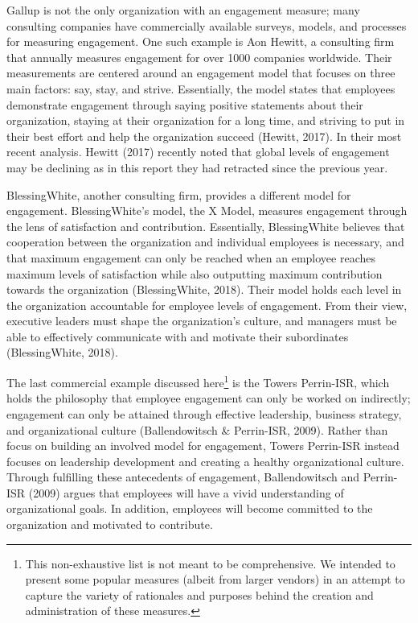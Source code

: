 \documentclass[
  man]{apa6}
\begin{document}
Gallup is not the only organization with an engagement measure; many consulting companies have commercially available surveys, models, and processes for measuring engagement. One such example is Aon Hewitt, a consulting firm that annually measures engagement for over 1000 companies worldwide. Their measurements are centered around an engagement model that focuses on three main factors: say, stay, and strive. Essentially, the model states that employees demonstrate engagement through saying positive statements about their organization, staying at their organization for a long time, and striving to put in their best effort and help the organization succeed (Hewitt, 2017). In their most recent analysis. Hewitt (2017) recently noted that global levels of engagement may be declining as in this report they had retracted since the previous year.

BlessingWhite, another consulting firm, provides a different model for engagement. BlessingWhite's model, the X Model, measures engagement through the lens of satisfaction and contribution. Essentially, BlessingWhite believes that cooperation between the organization and individual employees is necessary, and that maximum engagement can only be reached when an employee reaches maximum levels of satisfaction while also outputting maximum contribution towards the organization (BlessingWhite, 2018). Their model holds each level in the organization accountable for employee levels of engagement. From their view, executive leaders must shape the organization's culture, and managers must be able to effectively communicate with and motivate their subordinates (BlessingWhite, 2018).

The last commercial example discussed here\footnote{This non-exhaustive list is not meant to be comprehensive. We intended to present some popular measures (albeit from larger vendors) in an attempt to capture the variety of rationales and purposes behind the creation and administration of these measures.} is the Towers Perrin-ISR, which holds the philosophy that employee engagement can only be worked on indirectly; engagement can only be attained through effective leadership, business strategy, and organizational culture (Ballendowitsch \& Perrin-ISR, 2009). Rather than focus on building an involved model for engagement, Towers Perrin-ISR instead focuses on leadership development and creating a healthy organizational culture. Through fulfilling these antecedents of engagement, Ballendowitsch and Perrin-ISR (2009) argues that employees will have a vivid understanding of organizational goals. In addition, employees will become committed to the organization and motivated to contribute.
\end{document}
